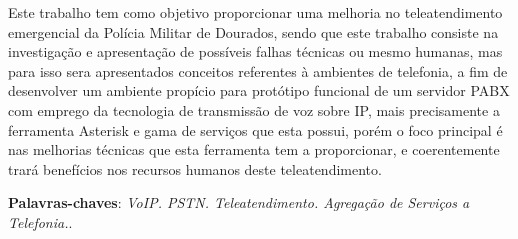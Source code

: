 \setlength{\absparsep}{18pt} %
\begin{resumo}

Este trabalho tem como objetivo proporcionar uma melhoria no teleatendimento emergencial da Polícia Militar de Dourados, sendo que este trabalho consiste na investigação e apresentação de possíveis falhas técnicas ou mesmo humanas, mas para isso sera apresentados conceitos referentes à ambientes de telefonia, a fim de desenvolver um ambiente propício para protótipo funcional de um servidor PABX com emprego da tecnologia de transmissão de voz sobre IP, mais precisamente a ferramenta Asterisk e gama de serviços que esta possui, porém o foco principal é nas melhorias técnicas que esta ferramenta tem a proporcionar, e coerentemente trará benefícios nos recursos humanos deste teleatendimento.


 \textbf{Palavras-chaves}: \textit{VoIP. PSTN. Teleatendimento. Agregação de Serviços a Telefonia.}.
\end{resumo}
